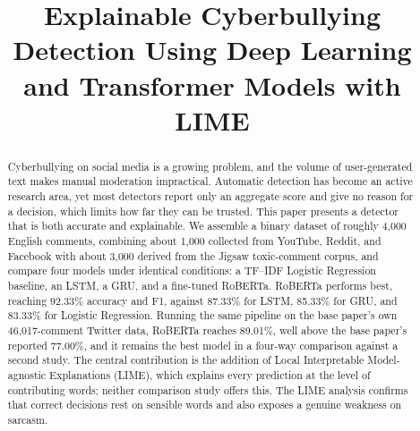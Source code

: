 \documentclass[conference]{IEEEtran}
\begin{document}
\title{Explainable Cyberbullying Detection Using Deep Learning and Transformer Models with LIME}

\author{
\and
{}
}

\maketitle

\begin{abstract}
Cyberbullying on social media is a growing problem, and the volume of user-generated text makes manual moderation impractical. Automatic detection has become an active research area, yet most detectors report only an aggregate score and give no reason for a decision, which limits how far they can be trusted. This paper presents a detector that is both accurate and explainable. We assemble a binary dataset of roughly 4{,}000 English comments, combining about 1{,}000 collected from YouTube, Reddit, and Facebook with about 3{,}000 derived from the Jigsaw toxic-comment corpus, and compare four models under identical conditions: a TF--IDF Logistic Regression baseline, an LSTM, a GRU, and a fine-tuned RoBERTa. RoBERTa performs best, reaching 92.33\% accuracy and F1, against 87.33\% for LSTM, 85.33\% for GRU, and 83.33\% for Logistic Regression. Running the same pipeline on the base paper's own 46{,}017-comment Twitter data, RoBERTa reaches 89.01\%, well above the base paper's reported 77.00\%, and it remains the best model in a four-way comparison against a second study. The central contribution is the addition of Local Interpretable Model-agnostic Explanations (LIME), which explains every prediction at the level of contributing words; neither comparison study offers this. The LIME analysis confirms that correct decisions rest on sensible words and also exposes a genuine weakness on sarcasm.
\end{abstract}
\end{document}
